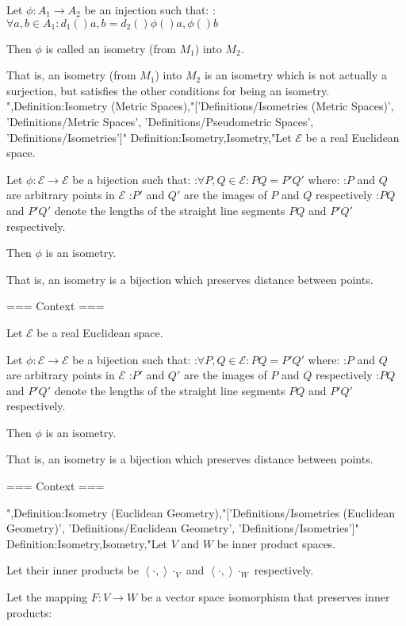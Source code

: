 Let $\phi: A_1 \to A_2$ be an injection such that:
:$\forall a, b \in A_1: d_1 \left(   \right){a, b} = d_2 \left(   \right){\phi \left(   \right)a, \phi \left(   \right)b}$


Then $\phi$ is called an isometry (from $M_1$) into $M_2$.


That is, an isometry (from $M_1$) into $M_2$ is an isometry which is not actually a surjection, but satisfies the other conditions for being an isometry.
",Definition:Isometry (Metric Spaces),"['Definitions/Isometries (Metric Spaces)', 'Definitions/Metric Spaces', 'Definitions/Pseudometric Spaces', 'Definitions/Isometries']"
Definition:Isometry,Isometry,"Let $\mathcal E$ be a real Euclidean space.


Let $\phi: \mathcal E \to \mathcal E$ be a bijection such that:
:$\forall P, Q \in \mathcal E: PQ = P'Q'$
where:
:$P$ and $Q$ are arbitrary points in $\mathcal E$
:$P'$ and $Q'$ are the images of $P$ and $Q$ respectively
:$PQ$ and $P'Q'$ denote the lengths of the straight line segments $PQ$ and $P'Q'$ respectively.


Then $\phi$ is an isometry.


That is, an isometry is a bijection which preserves distance between points.


=== Context ===

Let $\mathcal E$ be a real Euclidean space.


Let $\phi: \mathcal E \to \mathcal E$ be a bijection such that:
:$\forall P, Q \in \mathcal E: PQ = P'Q'$
where:
:$P$ and $Q$ are arbitrary points in $\mathcal E$
:$P'$ and $Q'$ are the images of $P$ and $Q$ respectively
:$PQ$ and $P'Q'$ denote the lengths of the straight line segments $PQ$ and $P'Q'$ respectively.


Then $\phi$ is an isometry.


That is, an isometry is a bijection which preserves distance between points.


=== Context ===

",Definition:Isometry (Euclidean Geometry),"['Definitions/Isometries (Euclidean Geometry)', 'Definitions/Euclidean Geometry', 'Definitions/Isometries']"
Definition:Isometry,Isometry,"Let $V$ and $W$ be inner product spaces.

Let their inner products be $\left\langle \cdot,   \right\rangle\cdot_V$ and $\left\langle \cdot,   \right\rangle\cdot_W$ respectively.

Let the mapping $F : V \to W$ be a vector space isomorphism that preserves inner products:


